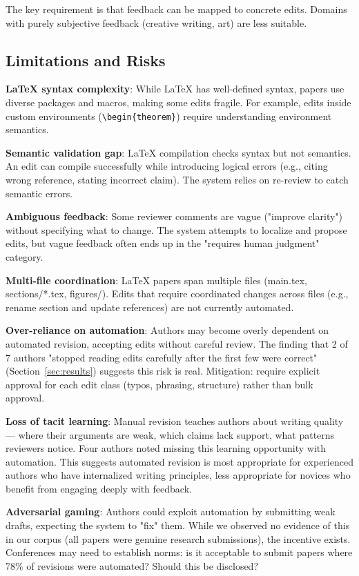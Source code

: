 The key requirement is that feedback can be mapped to concrete edits. Domains with purely subjective feedback (creative writing, art) are less suitable.

\subsection{Limitations and Risks}

\textbf{LaTeX syntax complexity}: While LaTeX has well-defined syntax, papers use diverse packages and macros, making some edits fragile. For example, edits inside custom environments (\texttt{\textbackslash{}begin\{theorem\}}) require understanding environment semantics.

\textbf{Semantic validation gap}: LaTeX compilation checks syntax but not semantics. An edit can compile successfully while introducing logical errors (e.g., citing wrong reference, stating incorrect claim). The system relies on re-review to catch semantic errors.

\textbf{Ambiguous feedback}: Some reviewer comments are vague ("improve clarity") without specifying what to change. The system attempts to localize and propose edits, but vague feedback often ends up in the "requires human judgment" category.

\textbf{Multi-file coordination}: LaTeX papers span multiple files (main.tex, sections/*.tex, figures/). Edits that require coordinated changes across files (e.g., rename section and update references) are not currently automated.

\textbf{Over-reliance on automation}: Authors may become overly dependent on automated revision, accepting edits without careful review. The finding that 2 of 7 authors "stopped reading edits carefully after the first few were correct" (Section~\ref{sec:results}) suggests this risk is real. Mitigation: require explicit approval for each edit class (typos, phrasing, structure) rather than bulk approval.

\textbf{Loss of tacit learning}: Manual revision teaches authors about writing quality — where their arguments are weak, which claims lack support, what patterns reviewers notice. Four authors noted missing this learning opportunity with automation. This suggests automated revision is most appropriate for experienced authors who have internalized writing principles, less appropriate for novices who benefit from engaging deeply with feedback.

\textbf{Adversarial gaming}: Authors could exploit automation by submitting weak drafts, expecting the system to "fix" them. While we observed no evidence of this in our corpus (all papers were genuine research submissions), the incentive exists. Conferences may need to establish norms: is it acceptable to submit papers where 78\% of revisions were automated? Should this be disclosed?

